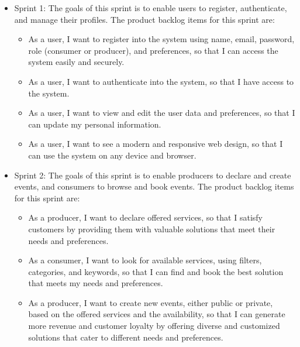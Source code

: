 \documentclass[a4paper,12pt]{article}
\begin{document}
\begin{itemize}
	\vspace{-0.3cm}
	\item Sprint 1: The goals of this sprint is to enable users to register, authenticate, and manage their profiles. The product backlog items for this sprint are:
		\begin{itemize}
			\vspace{-0.3cm}
			\item As a user, I want to register into the system using name, email, password, role (consumer or producer), and preferences, so that I can access the system easily and securely.
			\vspace{-0.2cm}
			\item As a user, I want to authenticate into the system, so that I have access to the system.
			\vspace{-0.6cm}
			\item As a user, I want to view and edit the user data and preferences, so that I can update my personal information.
			\vspace{-0.2cm}
			\item As a user, I want to see a modern and responsive web design, so that I can use the system on any device and browser.
		\end{itemize}
	\vspace{-0.3cm}
	\item Sprint 2: The goals of this sprint is to enable producers to declare and create events, and consumers to browse and book events. The product backlog items for this sprint are:
		\begin{itemize}
			\vspace{-0.3cm}
			\item As a producer, I want to declare offered services, so that I satisfy customers by providing them with valuable solutions that meet their needs and preferences.
			\vspace{-0.2cm}
			\item As a consumer, I want to look for available services, using filters, categories, and keywords, so that I can find and book the best solution that meets my needs and preferences.
			\vspace{-0.2cm}
			\item As a producer, I want to create new events, either public or private, based on the offered services and the availability, so that I can generate more revenue and customer loyalty by offering diverse and customized solutions that cater to different needs and preferences.

\end{itemize}
\end{itemize}
\end{document}
